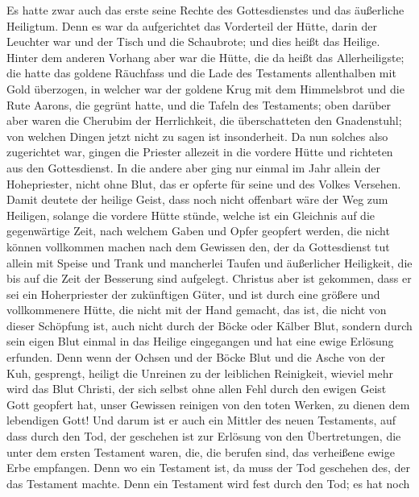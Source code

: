  Es hatte zwar auch das erste seine Rechte des
Gottesdienstes und das äußerliche Heiligtum.  Denn es war
da aufgerichtet das Vorderteil der Hütte, darin der Leuchter war und der
Tisch und die Schaubrote; und dies heißt das Heilige. 
Hinter dem anderen Vorhang aber war die Hütte, die da heißt das
Allerheiligste;  die hatte das goldene Räuchfass und die
Lade des Testaments allenthalben mit Gold überzogen, in welcher war der
goldene Krug mit dem Himmelsbrot und die Rute Aarons, die gegrünt hatte,
und die Tafeln des Testaments;  oben darüber aber waren
die Cherubim der Herrlichkeit, die überschatteten den Gnadenstuhl; von
welchen Dingen jetzt nicht zu sagen ist insonderheit.  Da
nun solches also zugerichtet war, gingen die Priester allezeit in die
vordere Hütte und richteten aus den Gottesdienst.  In die
andere aber ging nur einmal im Jahr allein der Hohepriester, nicht ohne
Blut, das er opferte für seine und des Volkes Versehen. 
Damit deutete der heilige Geist, dass noch nicht offenbart wäre der Weg
zum Heiligen, solange die vordere Hütte stünde,  welche
ist ein Gleichnis auf die gegenwärtige Zeit, nach welchem Gaben und
Opfer geopfert werden, die nicht können vollkommen machen nach dem
Gewissen den, der da Gottesdienst tut  allein mit Speise
und Trank und mancherlei Taufen und äußerlicher Heiligkeit, die bis auf
die Zeit der Besserung sind aufgelegt.  Christus aber ist
gekommen, dass er sei ein Hoherpriester der zukünftigen Güter, und ist
durch eine größere und vollkommenere Hütte, die nicht mit der Hand
gemacht, das ist, die nicht von dieser Schöpfung ist, 
auch nicht durch der Böcke oder Kälber Blut, sondern durch sein eigen
Blut einmal in das Heilige eingegangen und hat eine ewige Erlösung
erfunden.  Denn wenn der Ochsen und der Böcke Blut und
die Asche von der Kuh, gesprengt, heiligt die Unreinen zu der leiblichen
Reinigkeit,  wieviel mehr wird das Blut Christi, der sich
selbst ohne allen Fehl durch den ewigen Geist Gott geopfert hat, unser
Gewissen reinigen von den toten Werken, zu dienen dem lebendigen Gott!
 Und darum ist er auch ein Mittler des neuen Testaments,
auf dass durch den Tod, der geschehen ist zur Erlösung von den
Übertretungen, die unter dem ersten Testament waren, die, die berufen
sind, das verheißene ewige Erbe empfangen.  Denn wo ein
Testament ist, da muss der Tod geschehen des, der das Testament machte.
 Denn ein Testament wird fest durch den Tod; es hat noch
